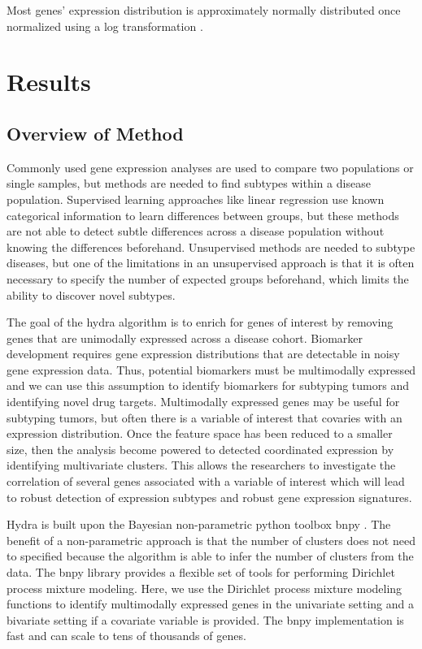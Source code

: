 \documentclass[fleqn,10pt]{wlscirep}
\begin{document}
Most genes' expression distribution is approximately normally distributed once normalized using a log transformation \cite{zwiener2014transforming}. 


\section*{Results}
\subsection*{Overview of Method}
Commonly used gene expression analyses are used to compare two populations or single samples, but methods are needed to find subtypes within a disease population. Supervised learning approaches like linear regression use known categorical information to learn differences between groups, but these methods are not able to detect subtle differences across a disease population without knowing the differences beforehand. Unsupervised methods are needed to subtype diseases, but one of the limitations in an unsupervised approach is that it is often necessary to specify the number of expected groups beforehand, which limits the ability to discover novel subtypes.

The goal of the hydra algorithm is to enrich for genes of interest by removing genes that are unimodally expressed across a disease cohort. Biomarker development requires gene expression distributions that are detectable in noisy gene expression data. Thus, potential biomarkers must be multimodally expressed and we can use this assumption to identify biomarkers for subtyping tumors and identifying novel drug targets. Multimodally expressed genes may be useful for subtyping tumors, but often there is a variable of interest that covaries with an expression distribution. Once the feature space has been reduced to a smaller size, then the analysis become powered to detected coordinated expression by identifying multivariate clusters. This allows the researchers to investigate the correlation of several genes associated with a variable of interest which will lead to robust detection of expression subtypes and robust gene expression signatures.

Hydra is built upon the Bayesian non-parametric python toolbox bnpy \cite{hughes2014bnpy}. The benefit of a non-parametric approach is that the number of clusters does not need to specified because the algorithm is able to infer the number of clusters from the data. The bnpy library provides a flexible set of tools for performing Dirichlet process mixture modeling. Here, we use the Dirichlet process mixture modeling functions to identify multimodally expressed genes in the univariate setting and a bivariate setting if a covariate variable is provided. The bnpy implementation is fast and can scale to tens of thousands of genes.
\end{document}
